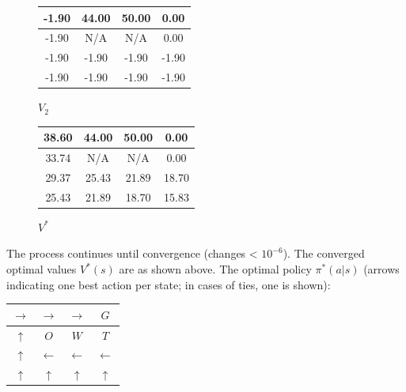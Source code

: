 \documentclass{article}
\begin{document}
\begin{figure}[H]
    \centering
    \begin{minipage}{0.3\textwidth}
        \centering
        \begin{tabular}{|c|c|c|c|}
        \hline
        -1.90 & 44.00 & 50.00 & 0.00 \\
        \hline
        -1.90 & N/A & N/A & 0.00 \\
        \hline
        -1.90 & -1.90 & -1.90 & -1.90 \\
        \hline
        -1.90 & -1.90 & -1.90 & -1.90 \\
        \hline
        \end{tabular}
        \vspace{0.5em}
        \small $V_2$
    \end{minipage}
    \hfill
    \begin{minipage}{0.3\textwidth}
        \centering
        \begin{tabular}{|c|c|c|c|}
        \hline
        38.60 & 44.00 & 50.00 & 0.00 \\
        \hline
        33.74 & N/A & N/A & 0.00 \\
        \hline
        29.37 & 25.43 & 21.89 & 18.70 \\
        \hline
        25.43 & 21.89 & 18.70 & 15.83 \\
        \hline
        \end{tabular}
        \vspace{0.5em}
        \small $V^*$
    \end{minipage}
\end{figure}

The process continues until convergence (changes < $10^{-6}$). The converged optimal values $V^*(s)$ are as shown above. The optimal policy $\pi^*(a|s)$ (arrows indicating one best action per state; in cases of ties, one is shown):

\begin{center}
\begin{tabular}{|c|c|c|c|}
\hline
$\rightarrow$ & $\rightarrow$ & $\rightarrow$ & $G$ \\
\hline
$\uparrow$ & $O$ & $W$ & $T$ \\
\hline
$\uparrow$ & $\leftarrow$ & $\leftarrow$ & $\leftarrow$ \\
\hline
$\uparrow$ & $\uparrow$ & $\uparrow$ & $\uparrow$ \\
\hline
\end{tabular}
\end{center}
\end{document}
